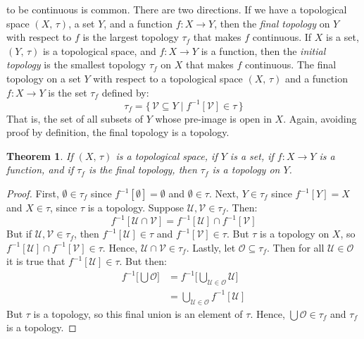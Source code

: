 \documentclass{article}
\theoremstyle{plain}
\newtheorem{theorem}{Theorem}[section]
\theoremstyle{normal}
\newenvironment{definition}{%
    \pushQED{\qed}\renewcommand{\qedsymbol}{$\blacksquare$}\definitionx%
}{%
    \popQED\enddefinitionx%
}
\begin{document}
        to be continuous is common. There are two directions. If we have a
        topological space $(X,\,\tau)$, a set $Y$, and a function
        $f:X\rightarrow{Y}$, then the \textit{final topology} on $Y$ with
        respect to $f$ is the largest topology $\tau_{f}$ that makes $f$
        continuous. If $X$ is a set, $(Y,\,\tau)$ is a topological space, and
        $f:X\rightarrow{Y}$ is a function, then the \textit{initial topology}
        is the smallest topology $\tau_{f}$ on $X$ that makes $f$ continuous.
        \begin{definition}[\textbf{Final Topology}]
            The final topology on a set $Y$ with respect to a topological
            space $(X,\,\tau)$ and a function $f:X\rightarrow{Y}$ is the
            set $\tau_{f}$ defined by:
            \begin{equation}
                \tau_{f}=
                \{\,\mathcal{V}\subseteq{Y}\;|\;f^{-1}[\mathcal{V}]\in\tau\,\}
            \end{equation}
            That is, the set of all subsets of $Y$ whose pre-image is open in
            $X$.
        \end{definition}
        Again, avoiding proof by definition, the final topology is a topology.
        \begin{theorem}
            If $(X,\,\tau)$ is a topological space, if $Y$ is a set, if
            $f:X\rightarrow{Y}$ is a function, and if $\tau_{f}$ is the final
            topology, then $\tau_{f}$ is a topology on $Y$.
        \end{theorem}
        \begin{proof}
            First, $\emptyset\in\tau_{f}$ since $f^{-1}[\emptyset]=\emptyset$
            and $\emptyset\in\tau$. Next, $Y\in\tau_{f}$ since $f^{-1}[Y]=X$
            and $X\in\tau$, since $\tau$ is a topology. Suppose
            $\mathcal{U},\mathcal{V}\in\tau_{f}$. Then:
            \begin{equation}
                f^{-1}[\mathcal{U}\cap\mathcal{V}]
                =f^{-1}[\mathcal{U}]\cap{f}^{-1}[\mathcal{V}]
            \end{equation}
            But if $\mathcal{U},\mathcal{V}\in\tau_{f}$, then
            $f^{-1}[\mathcal{U}]\in\tau$ and $f^{-1}[\mathcal{V}]\in\tau$. But
            $\tau$ is a topology on $X$, so
            $f^{-1}[\mathcal{U}]\cap{f}^{-1}[\mathcal{V}]\in\tau$. Hence,
            $\mathcal{U}\cap\mathcal{V}\in\tau_{f}$. Lastly, let
            $\mathcal{O}\subseteq\tau_{f}$. Then for all
            $\mathcal{U}\in\mathcal{O}$ it is true that
            $f^{-1}[\mathcal{U}]\in\tau$. But then:
            \begin{align}
                f^{-1}\Big[\bigcup\mathcal{O}\Big]
                &=f^{-1}\Big[
                    \bigcup_{\mathcal{U}\in\mathcal{O}}\mathcal{U}
                \Big]\\
                &=\bigcup_{\mathcal{U}\in\mathcal{O}}f^{-1}[\mathcal{U}]
            \end{align}
            But $\tau$ is a topology, so this final union is an element of
            $\tau$. Hence, $\bigcup\mathcal{O}\in\tau_{f}$ and $\tau_{f}$ is
            a topology.
        \end{proof}
\end{document}
